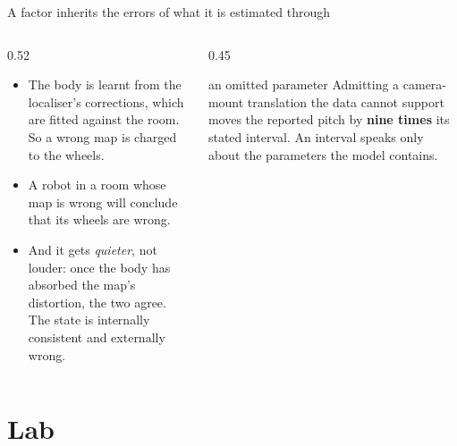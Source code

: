 \documentclass[10pt, aspectratio=169]{beamer}
\begin{document}
\begin{frame}{A factor inherits the errors of what it is estimated through}
  \begin{columns}[T]
    \begin{column}{0.52\textwidth}
      \begin{itemize}
        \item The body is learnt from the localiser's corrections, which are fitted against the
              room. So a wrong map is charged to the wheels.
        \item \alert{A robot in a room whose map is wrong will conclude that its wheels are
              wrong.}
        \item And it gets \emph{quieter}, not louder: once the body has absorbed the map's
              distortion, the two agree. The state is internally consistent and externally wrong.
      \end{itemize}
    \end{column}
    \begin{column}{0.45\textwidth}
      \begin{measured}{an omitted parameter}
        Admitting a camera-mount translation the data cannot support moves the reported pitch by
        \textbf{nine times} its stated interval. An interval speaks only about the parameters the
        model contains.
      \end{measured}
    \end{column}
  \end{columns}
\end{frame}

\section{Lab}
\end{document}

